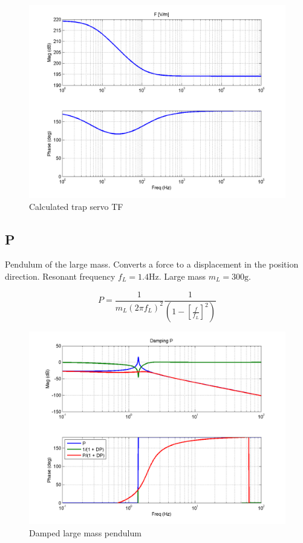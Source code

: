 \vspace{30pt}

\begin{figure}[htb]
\includegraphics[width=\columnwidth]{figures/controls/F.png}%
\caption{Calculated trap servo TF}%
\label{fig:F}%
\end{figure}

\subsection{P}

Pendulum of the large mass. Converts a force to a displacement in the position direction.  Resonant frequency $f_L = 1.4 \mbox{Hz}$.  Large mass $m_L = 300 \mbox{g}$.

\begin{equation}
P = \frac{1}{m_L (2 \pi f_L)^2} \frac{1}{\left(1 - \left[\frac{f}{f_L}\right]^2\right)}
\label{eq:P}
\end{equation}

\vspace{30pt}

\begin{figure}[htb]
\includegraphics[width=\columnwidth]{figures/controls/P.png}%
\caption{Damped large mass pendulum}%
\label{fig:DPloop}%
\end{figure}

